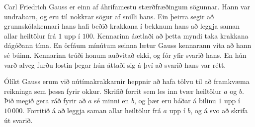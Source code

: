 
Carl Friedrich Gauss er einn af áhrifamestu stærðfræðingum sögunnar. Hann var
undrabarn, og eru til nokkrar sögur af snilli hans. Ein þeirra segir að
grunnskólakennari hans hafi beðið krakkana í bekknum hans að leggja saman allar
heiltölur frá $1$ upp í $100$. Kennarinn áætlaði að þetta myndi taka krakkana
dágóðann tíma. En örfáum mínútum seinna lætur Gauss kennarann vita að hann sé
búinn. Kennarinn trúði honum auðvitað ekki, og fór yfir svarið hans. En hún
varð alveg furðu lostin þegar hún áttaði sig á því að svarið hans var rétt.

Ólíkt Gauss erum við nútímakrakkarnir heppnir að hafa tölvu til að framkvæma
reikninga sem þessa fyrir okkur. Skrifið forrit sem les inn tvær heiltölur $a$
og $b$. Þið megið gera ráð fyrir að $a$ sé minni en $b$, og þær eru báðar á
bilinu $1$ upp í $10\,000$. Forritið á að leggja saman allar heiltölur frá $a$
upp í $b$, og á svo að skrifa út svarið.


